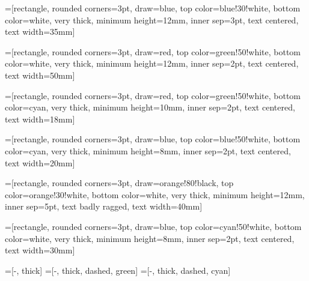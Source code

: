 
%
%

=[rectangle, rounded corners=3pt, draw=blue, top color=blue!30!white, bottom
color=white, very thick, minimum height=12mm, inner sep=3pt, text centered, text width=35mm]

=[rectangle, rounded corners=3pt, draw=red, top color=green!50!white, bottom
color=white, very thick, minimum height=12mm, inner sep=2pt, text centered, text width=50mm]

=[rectangle, rounded corners=3pt, draw=red, top color=green!50!white, bottom
color=cyan, very thick, minimum height=10mm, inner sep=2pt, text centered, text width=18mm]

=[rectangle, rounded corners=3pt, draw=blue, top color=blue!50!white, bottom
color=cyan, very thick, minimum height=8mm, inner sep=2pt, text centered, text width=20mm]

=[rectangle, rounded corners=3pt, draw=orange!80!black, top color=orange!30!white,
bottom color=white, very thick, minimum height=12mm, inner sep=5pt, text badly ragged, text width=40mm]

=[rectangle, rounded corners=3pt, draw=blue, top color=cyan!50!white, bottom
color=white, very thick, minimum height=8mm, inner sep=2pt, text centered, text width=30mm]

=[-, thick]
=[-, thick, dashed, green]
=[-, thick, dashed, cyan]


